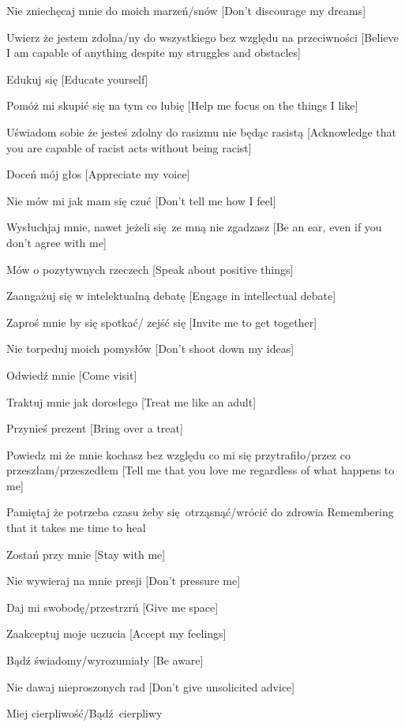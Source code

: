 \begin{multicols}{2}
\begin{checkboxlist}
\item Nie zniechęcaj mnie do moich marzeń/snów [Don’t discourage my dreams]
\item Uwierz że jestem zdolna/ny do wszystkiego bez względu na przeciwności [Believe I am capable of anything despite my struggles and obstacles]
\item Edukuj się [Educate yourself]
\item Pomóż mi skupić się na tym co lubię [Help me focus on the things I like]
\item Uświadom sobie że jesteś zdolny do rasizmu nie będąc rasistą [Acknowledge that you are capable of racist acts without being racist]
\item Doceń mój głos [Appreciate my voice]
\item Nie mów mi jak mam się czuć [Don’t tell me how I feel]
\item Wysłuchjaj mnie, nawet jeżeli się ze mną nie zgadzasz [Be an ear, even if you don’t agree with me]
\item Mów o pozytywnych rzeczech [Speak about positive things]
\item Zaangażuj się w intelektualną debatę [Engage in intellectual debate]
\item Zaproś mnie by się spotkać/ zejść się [Invite me to get together]
\item Nie torpeduj moich pomysłów [Don’t shoot down my ideas]
\item Odwiedź mnie [Come visit]
\item Traktuj mnie jak dorosłego [Treat me like an adult]
\item Przynieś prezent [Bring over a treat]
\item Powiedz mi że mnie kochasz bez względu co mi się przytrafiło/przez co przeszłam/przeszedłem [Tell me that you love me regardless of what happens to me]
\item Pamiętaj że potrzeba czasu żeby się otrząsnąć/wrócić do zdrowia Remembering that it takes me time to heal
\item Zostań przy mnie [Stay with me]
\item Nie wywieraj na mnie presji [Don’t pressure me]
\item Daj mi swobodę/przestrzrń [Give me space]
\item Zaakceptuj moje uczucia [Accept my feelings]
\item Bądź świadomy/wyrozumiały [Be aware]
\item Nie dawaj nieproszonych rad [Don’t give unsolicited advice]
\item Miej cierpliwość/Bądź cierpliwy

\end{checkboxlist}
\end{multicols}
